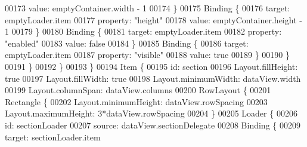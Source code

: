 \begin{DoxyCode}
{00173 \textcolor{comment}{                                    value: emptyContainer.width - 1}
00174 \textcolor{comment}{                                \}}
00175 \textcolor{comment}{                                Binding \{}
00176 \textcolor{comment}{                                    target: emptyLoader.item}
00177 \textcolor{comment}{                                    property: "height"}
00178 \textcolor{comment}{                                    value: emptyContainer.height - 1}
00179 \textcolor{comment}{                                \}}
00180 \textcolor{comment}{                                Binding \{}
00181 \textcolor{comment}{                                    target: emptyLoader.item}
00182 \textcolor{comment}{                                    property: "enabled"}
00183 \textcolor{comment}{                                    value: false}
00184 \textcolor{comment}{                                \}}
00185 \textcolor{comment}{                                Binding \{}
00186 \textcolor{comment}{                                    target: emptyLoader.item}
00187 \textcolor{comment}{                                    property: "visible"}
00188 \textcolor{comment}{                                    value: true}
00189 \textcolor{comment}{                                \}}
00190 \textcolor{comment}{                            \}}
00191 \textcolor{comment}{                        \}}
00192 \textcolor{comment}{                    \}}
00193 \textcolor{comment}{                \}}
00194 \textcolor{comment}{                Item \{}
00195 \textcolor{comment}{                    id: section}
00196 \textcolor{comment}{                    Layout.fillHeight: true}
00197 \textcolor{comment}{                    Layout.fillWidth: true}
00198 \textcolor{comment}{                    Layout.minimumWidth: dataView.width}
00199 \textcolor{comment}{                    Layout.columnSpan: dataView.columns}
00200 \textcolor{comment}{                    RowLayout \{}
00201 \textcolor{comment}{                        Rectangle \{}
00202 \textcolor{comment}{                            Layout.minimumHeight: dataView.rowSpacing}
00203 \textcolor{comment}{                            Layout.maximumHeight: 3*dataView.rowSpacing}
00204 \textcolor{comment}{                        \}}
00205 \textcolor{comment}{                        Loader \{}
00206 \textcolor{comment}{                            id: sectionLoader}
00207 \textcolor{comment}{                            source: dataView.sectionDelegate}
00208 \textcolor{comment}{                            Binding \{}
00209 \textcolor{comment}{                                target: sectionLoader.item}
}
\end{DoxyCode}
